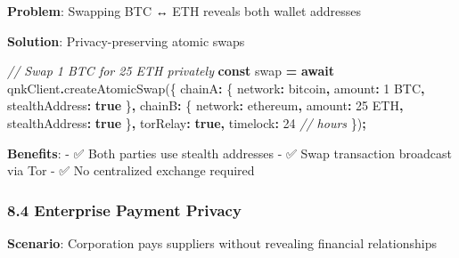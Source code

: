 \documentclass[
  11pt,
]{article}
\newenvironment{Shaded}{\begin{snugshade}}{\end{snugshade}}
\newcommand{\CommentTok}[1]{\textcolor[rgb]{0.56,0.35,0.01}{\textit{#1}}}
\newcommand{\ControlFlowTok}[1]{\textcolor[rgb]{0.13,0.29,0.53}{\textbf{#1}}}
\newcommand{\DataTypeTok}[1]{\textcolor[rgb]{0.13,0.29,0.53}{#1}}
\newcommand{\DecValTok}[1]{\textcolor[rgb]{0.00,0.00,0.81}{#1}}
\newcommand{\FunctionTok}[1]{\textcolor[rgb]{0.00,0.00,0.00}{#1}}
\newcommand{\KeywordTok}[1]{\textcolor[rgb]{0.13,0.29,0.53}{\textbf{#1}}}
\newcommand{\NormalTok}[1]{#1}
\newcommand{\OperatorTok}[1]{\textcolor[rgb]{0.81,0.36,0.00}{\textbf{#1}}}
\newcommand{\StringTok}[1]{\textcolor[rgb]{0.31,0.60,0.02}{#1}}
\begin{document}
\textbf{Problem}: Swapping BTC ↔ ETH reveals both wallet addresses

\textbf{Solution}: Privacy-preserving atomic swaps

\begin{Shaded}
\begin{Highlighting}[]
\CommentTok{// Swap 1 BTC for 25 ETH privately}
\KeywordTok{const}\NormalTok{ swap }\OperatorTok{=} \ControlFlowTok{await}\NormalTok{ qnkClient}\OperatorTok{.}\FunctionTok{createAtomicSwap}\NormalTok{(\{}
  \DataTypeTok{chainA}\OperatorTok{:}\NormalTok{ \{}
    \DataTypeTok{network}\OperatorTok{:} \StringTok{\textquotesingle{}bitcoin\textquotesingle{}}\OperatorTok{,}
    \DataTypeTok{amount}\OperatorTok{:} \StringTok{\textquotesingle{}1 BTC\textquotesingle{}}\OperatorTok{,}
    \DataTypeTok{stealthAddress}\OperatorTok{:} \KeywordTok{true}
\NormalTok{  \}}\OperatorTok{,}
  \DataTypeTok{chainB}\OperatorTok{:}\NormalTok{ \{}
    \DataTypeTok{network}\OperatorTok{:} \StringTok{\textquotesingle{}ethereum\textquotesingle{}}\OperatorTok{,}
    \DataTypeTok{amount}\OperatorTok{:} \StringTok{\textquotesingle{}25 ETH\textquotesingle{}}\OperatorTok{,}
    \DataTypeTok{stealthAddress}\OperatorTok{:} \KeywordTok{true}
\NormalTok{  \}}\OperatorTok{,}
  \DataTypeTok{torRelay}\OperatorTok{:} \KeywordTok{true}\OperatorTok{,}
  \DataTypeTok{timelock}\OperatorTok{:} \DecValTok{24}  \CommentTok{// hours}
\NormalTok{\})}\OperatorTok{;}
\end{Highlighting}
\end{Shaded}

\textbf{Benefits}: - ✅ Both parties use stealth addresses - ✅ Swap
transaction broadcast via Tor - ✅ No centralized exchange required

\hypertarget{enterprise-payment-privacy}{%
\subsubsection{8.4 Enterprise Payment
Privacy}\label{enterprise-payment-privacy}}

\textbf{Scenario}: Corporation pays suppliers without revealing
financial relationships
\end{document}
